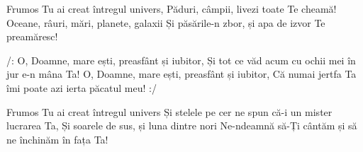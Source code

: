 \beginverse
Frumos Tu ai creat întregul univers,
Păduri, câmpii, livezi toate Te cheamă!
Oceane, râuri, mări, planete, galaxii
Și păsările-n zbor, și apa de izvor Te preamăresc!
\endverse

\beginchorus
/: O, Doamne, mare ești, preasfânt și iubitor,
Și tot ce văd acum cu ochii mei în jur e-n mâna Ta!
O, Doamne, mare ești, preasfânt și iubitor,
Că numai jertfa Ta îmi poate azi ierta păcatul meu! :/
\endchorus

\beginverse
Frumos Tu ai creat întregul univers
Și stelele pe cer ne spun că-i un mister lucrarea Ta,
Și soarele de sus, și luna dintre nori
Ne-ndeamnă să-Ți cântăm și să ne închinăm în fața Ta!
\endverse
\endsong